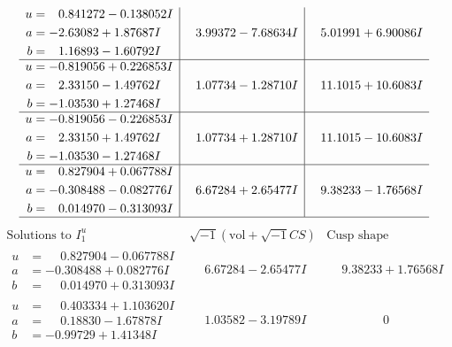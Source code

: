 \documentclass[1p]{elsarticle_modified}
\theoremstyle{definition}
\newcommand{\I}{\sqrt{-1}}
\begin{document}
$$\begin{array}{c|c|c}
\begin{aligned}
u &= \phantom{-}0.841272 - 0.138052 I \\
a &= -2.63082 + 1.87687 I \\
b &= \phantom{-}1.16893 - 1.60792 I\end{aligned}
 & \phantom{-}3.99372 - 7.68634 I & \phantom{-}5.01991 + 6.90086 I \\ \hline\begin{aligned}
u &= -0.819056 + 0.226853 I \\
a &= \phantom{-}2.33150 - 1.49762 I \\
b &= -1.03530 + 1.27468 I\end{aligned}
 & \phantom{-}1.07734 - 1.28710 I & \phantom{-}11.1015 + 10.6083 I \\ \hline\begin{aligned}
u &= -0.819056 - 0.226853 I \\
a &= \phantom{-}2.33150 + 1.49762 I \\
b &= -1.03530 - 1.27468 I\end{aligned}
 & \phantom{-}1.07734 + 1.28710 I & \phantom{-}11.1015 - 10.6083 I \\ \hline\begin{aligned}
u &= \phantom{-}0.827904 + 0.067788 I \\
a &= -0.308488 - 0.082776 I \\
b &= \phantom{-}0.014970 - 0.313093 I\end{aligned}
 & \phantom{-}6.67284 + 2.65477 I & \phantom{-}9.38233 - 1.76568 I\\
 \hline 
 \end{array}$$\newpage$$\begin{array}{c|c|c}  
\text{Solutions to }I^u_{1}& \I (\text{vol} + \sqrt{-1}CS) & \text{Cusp shape}\\
 \hline 
\begin{aligned}
u &= \phantom{-}0.827904 - 0.067788 I \\
a &= -0.308488 + 0.082776 I \\
b &= \phantom{-}0.014970 + 0.313093 I\end{aligned}
 & \phantom{-}6.67284 - 2.65477 I & \phantom{-}9.38233 + 1.76568 I \\ \hline\begin{aligned}
u &= \phantom{-}0.403334 + 1.103620 I \\
a &= \phantom{-}0.18830 - 1.67878 I \\
b &= -0.99729 + 1.41348 I\end{aligned}
 & \phantom{-}1.03582 - 3.19789 I & \phantom{-0.000000 } 0 \\ \hline\begin{aligned}

\end{aligned}
\end{array}$$
\end{document}
